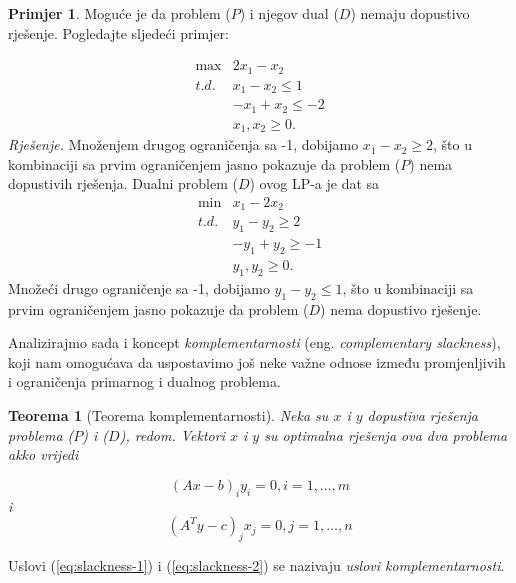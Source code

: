 \documentclass[a4paper, utf8, 11pt, colorlinks]{book}
\newtheorem{thm}{Teorema}[chapter]
\theoremstyle{definition}
\newtheorem{primjer}{Primjer}[chapter]
\begin{document}
\begin{primjer} Moguće je da problem ($P$) i njegov   dual ($D$) nemaju dopustivo rješenje. Pogledajte sljedeći primjer:
	\end{primjer}
$$\begin{array}{cc}
    \max          & 2 x_1 - x_2 \\
     {t.d. }      & x_1 - x_2 \leq 1 \\
                  & -x_1 + x_2 \leq -2 \\
                  & x_1, x_2 \geq 0.
\end{array}$$
\emph{Rješenje.} Množenjem drugog ograničenja sa -1, dobijamo $x_1 - x_2 \geq 2$, što u kombinaciji sa prvim ograničenjem jasno pokazuje da problem ($P$) nema dopustivih rješenja. Dualni problem ($D$) ovog LP-a je dat sa 
$$\begin{array}{cc}
	\min          &x_1 - 2x_2 \\
	{t.d. }       & y_1 -y_2 \geq 2 \\
				  & -y_1 + y_2 \geq -1 \\
				  & y_1, y_2 \geq 0.
\end{array}$$
Množeći drugo ograničenje sa -1, dobijamo $y_1 -y_2 \leq 1$, što u kombinaciji sa prvim ograničenjem jasno pokazuje da problem ($D$) nema dopustivo rješenje. ~

Analizirajmo sada i koncept  \emph{komplementarnosti} (eng. \emph{complementary slackness}), koji nam omogućava da uspostavimo još neke važne odnose između promjenljivih i ograničenja primarnog i dualnog problema. 
\begin{thm}[Teorema komplementarnosti]
      Neka su $x$ i $y$ dopustiva rješenja problema ($P$) i  ($D$), redom. Vektori $x$ i $y$ su optimalna rješenja ova dva problema akko vrijedi 
      
            \begin{equation}\label{eq:slackness-2}
      	(Ax - b)_i y_i = 0, i=1,\ldots,m
      \end{equation}
   i
      \begin{equation}\label{eq:slackness-1}
           (A^Ty - c)_j x_j = 0, j=1,\ldots,n
      \end{equation}   

\end{thm}
Uslovi (\ref{eq:slackness-1}) i (\ref{eq:slackness-2}) se nazivaju \emph{uslovi komplementarnosti}.
\end{document}
